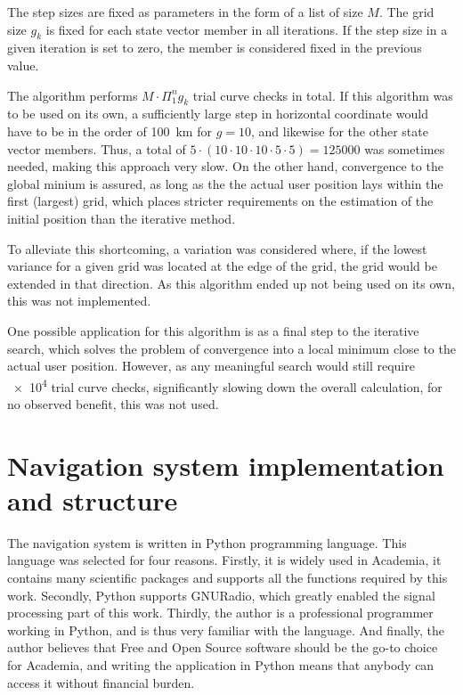 The step sizes are fixed as parameters in the form of a list of size $M$. The grid size $g_k$ is fixed for each state vector member in all iterations. If the step size in a given iteration is set to zero, the member is considered fixed in the previous value.

The algorithm performs $M \cdot \Pi^n_1 g_k$ trial curve checks in total. If this algorithm was to be used on its own, a sufficiently large step in horizontal coordinate would have to be in the order of \qty{100}{km} for $g = 10$, and likewise for the other state vector members. Thus, a total of $5 \cdot (10 \cdot 10 \cdot 10 \cdot 5 \cdot 5) = \num{125000}$ was sometimes needed, making this approach very slow. On the other hand, convergence to the global minium is assured, as long as the the actual user position lays within the first (largest) grid, which places stricter requirements on the estimation of the initial position than the iterative method.

To alleviate this shortcoming, a variation was considered where, if the lowest variance for a given grid was located at the edge of the grid, the grid would be extended in that direction. As this algorithm ended up not being used on its own, this was not implemented.

One possible application for this algorithm is as a final step to the iterative search, which solves the problem of convergence into a local minimum close to the actual user position. However, as any meaningful search would still require \num{e4} trial curve checks, significantly slowing down the overall calculation, for no observed benefit, this was not used.


\section{Navigation system implementation and structure}
The navigation system is written in Python programming language. This language was selected for four reasons. Firstly, it is widely used in Academia, it contains many scientific packages and supports all the functions required by this work. Secondly, Python supports GNURadio, which greatly enabled the signal processing part of this work. Thirdly, the author is a professional programmer working in Python, and is thus very familiar with the language. And finally, the author believes that Free and Open Source software should be the go-to choice for Academia, and writing the application in Python means that anybody can access it without financial burden.

